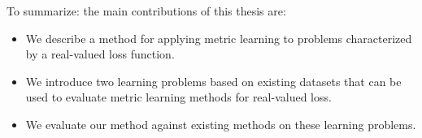 To summarize: the main contributions of this thesis are:
\begin{itemize}
\item We describe a method for applying metric learning to problems characterized by a real-valued loss function.
\item We introduce two learning problems based on existing datasets that can be used to evaluate metric learning methods for real-valued loss.
\item We evaluate our method against existing methods on these learning problems.
\end{itemize}

